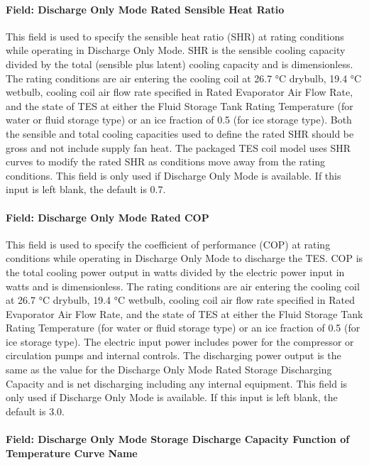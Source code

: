 \paragraph{Field: Discharge Only Mode Rated Sensible Heat Ratio}\label{field-discharge-only-mode-rated-sensible-heat-ratio}

This field is used to specify the sensible heat ratio (SHR) at rating conditions while operating in Discharge Only Mode. SHR is the sensible cooling capacity divided by the total (sensible plus latent) cooling capacity and is dimensionless. The rating conditions are air entering the cooling coil at 26.7 °C drybulb, 19.4 °C wetbulb, cooling coil air flow rate specified in Rated Evaporator Air Flow Rate, and the state of TES at either the Fluid Storage Tank Rating Temperature (for water or fluid storage type) or an ice fraction of 0.5 (for ice storage type). Both the sensible and total cooling capacities used to define the rated SHR should be gross and not include supply fan heat. The packaged TES coil model uses SHR curves to modify the rated SHR as conditions move away from the rating conditions. This field is only used if Discharge Only Mode is available. If this input is left blank, the default is 0.7.

\paragraph{Field: Discharge Only Mode Rated COP}\label{field-discharge-only-mode-rated-cop}

This field is used to specify the coefficient of performance (COP) at rating conditions while operating in Discharge Only Mode to discharge the TES. COP is the total cooling power output in watts divided by the electric power input in watts and is dimensionless. The rating conditions are air entering the cooling coil at 26.7 °C drybulb, 19.4 °C wetbulb, cooling coil air flow rate specified in Rated Evaporator Air Flow Rate, and the state of TES at either the Fluid Storage Tank Rating Temperature (for water or fluid storage type) or an ice fraction of 0.5 (for ice storage type). The electric input power includes power for the compressor or circulation pumps and internal controls. The discharging power output is the same as the value for the Discharge Only Mode Rated Storage Discharging Capacity and is net discharging including any internal equipment. This field is only used if Discharge Only Mode is available. If this input is left blank, the default is 3.0.

\paragraph{Field: Discharge Only Mode Storage Discharge Capacity Function of Temperature Curve Name}\label{field-discharge-only-mode-storage-discharge-capacity-function-of-temperature-curve-name}

